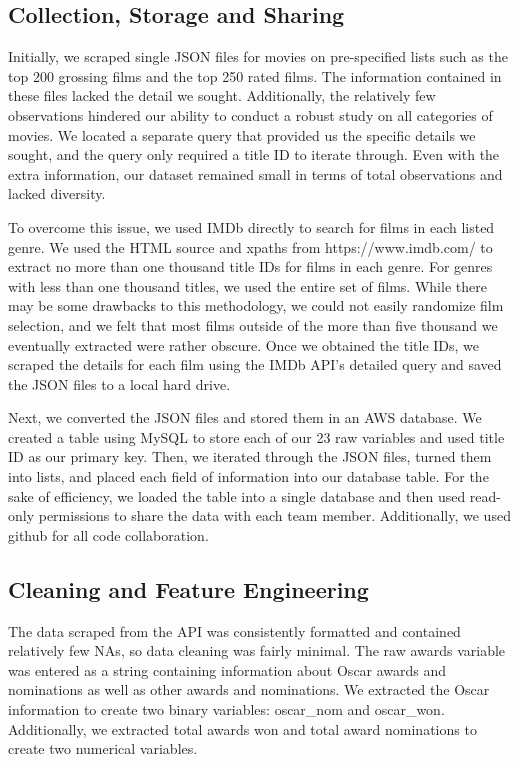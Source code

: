 \documentclass[10pt]{article}
\begin{document}
\subsection{Collection, Storage and Sharing}

Initially, we scraped single JSON files for movies on pre-specified lists such as the top 200 grossing films and the top 250 rated films. The information contained in these files lacked the detail we sought. Additionally, the relatively few observations hindered our ability to conduct a robust study on all categories of movies. We located a separate query that provided us the specific details we sought, and the query only required a title ID to iterate through. Even with the extra information, our dataset remained small in terms of total observations and lacked diversity.

To overcome this issue, we used IMDb directly to search for films in each listed genre. We used the HTML source and xpaths from https://www.imdb.com/ to extract no more than one thousand title IDs for films in each genre. For genres with less than one thousand titles, we used the entire set of films. While there may be some drawbacks to this methodology, we could not easily randomize film selection, and we felt that most films outside of the more than five thousand we eventually extracted were rather obscure. Once we obtained the title IDs, we scraped the details for each film using the IMDb API’s detailed query and saved the JSON files to a local hard drive.

Next, we converted the JSON files and stored them in an AWS database. We created a table using MySQL to store each of our 23 raw variables and used title ID as our primary key. Then, we iterated through the JSON files, turned them into lists, and placed each field of information into our database table. For the sake of efficiency, we loaded the table into a single database and then used read-only permissions to share the data with each team member. Additionally, we used github for all code collaboration.


\subsection{Cleaning and Feature Engineering}

The data scraped from the API was consistently formatted and contained relatively few NAs, so data cleaning was fairly minimal. The raw awards variable was entered as a string containing information about Oscar awards and nominations as well as other awards and nominations. We extracted the Oscar information to create two binary variables: oscar\_nom and oscar\_won. Additionally, we extracted total awards won and total award nominations to create two numerical variables.
\end{document}
